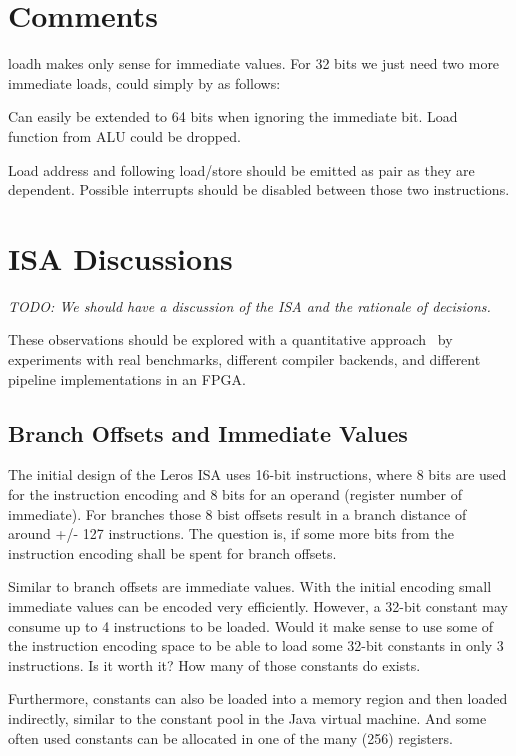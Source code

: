\documentclass[a4paper,fontsize=10pt,twoside,DIV15,BCOR12mm,headinclude=true,footinclude=false,pagesize,bibtotoc]{scrbook}
\newcommand{\todo}[1]{{\emph{TODO: #1}}}
\begin{document}
\section{Comments}

loadh makes only sense for immediate values. For 32 bits we just need two more immediate loads, could simply by as follows:

Can easily be extended to 64 bits when ignoring the immediate bit. Load function from ALU could be dropped.

Load address and following load/store should be emitted as pair as they are dependent. Possible interrupts should be disabled between those two instructions.

\section{ISA Discussions}

\todo{We should have a discussion of the ISA and the rationale of decisions.}

These observations should be explored with a quantitative approach~\cite{H and P} by experiments
with real benchmarks, different compiler backends, and different pipeline implementations in
an FPGA.

\subsection{Branch Offsets and Immediate Values}

The initial design of the Leros ISA uses 16-bit instructions, where 8 bits are used for the
instruction encoding and 8 bits for an operand (register number of immediate). For branches
those 8 bist offsets result in a branch distance of around +/- 127 instructions.
The question is, if some more bits from the instruction encoding shall be spent for
branch offsets.



Similar to branch offsets are immediate values. With the initial encoding small immediate
values can be encoded very efficiently. However, a 32-bit constant may consume up to 4
instructions to be loaded. Would it make sense to use some of the instruction encoding space
to be able to load some 32-bit constants in only 3 instructions. Is it worth it? How many of those
constants do exists.

Furthermore, constants can also be loaded into a memory region and then loaded indirectly,
similar to the constant pool in the Java virtual machine. And some often used constants can
be allocated in one of the many (256) registers.
\end{document}
